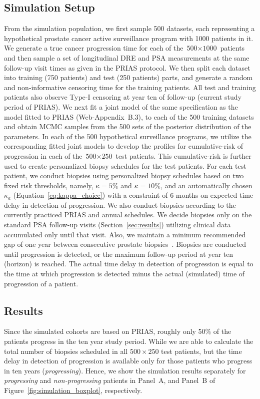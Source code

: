 \subsection{Simulation Setup}
From the simulation population, we first sample 500 datasets, each representing a hypothetical prostate cancer active surveillance program with 1000 patients in it. We generate a true cancer progression time for each of the ${\mbox{500} \times \mbox{1000}}$ patients and then sample a set of longitudinal DRE and PSA measurements at the same follow-up visit times as given in the PRIAS protocol. We then split each dataset into training (750 patients) and test (250 patients) parts, and generate a random and non‐informative censoring time for the training patients. All test and training patients also observe Type-I censoring at year ten of follow-up (current study period of PRIAS). We next fit a joint model of the same specification as the model fitted to PRIAS (Web-Appendix~B.3), to each of the 500 training datasets and obtain MCMC samples from the 500 sets of the posterior distribution of the parameters. In each of the 500 hypothetical surveillance programs, we utilize the corresponding fitted joint models to develop the profiles for cumulative-risk of progression in each of the ${\mbox{500} \times \mbox{250}}$ test patients. This cumulative-risk is further used to create personalized biopsy schedules for the test patients. For each test patient, we conduct biopsies using personalized biopsy schedules based on two fixed risk thresholds, namely, $\kappa=5\%$ and $\kappa=10\%$, and an automatically chosen $\kappa_a$ (Equation~\ref{eq:kappa_choice}) with a constraint of 6 months on expected time delay in detection of progression. We also conduct biopsies according to the currently practiced PRIAS and annual schedules. We decide biopsies only on the standard PSA follow-up visits (Section~\ref{sec:results}) utilizing clinical data accumulated only until that visit. Also, we maintain a minimum recommended gap of one year between consecutive prostate biopsies~\citep{bokhorst2015compliance}. Biopsies are conducted until progression is detected, or the maximum follow-up period at year ten (horizon) is reached. The actual time delay in detection of progression is equal to the time at which progression is detected minus the actual (simulated) time of progression of a patient.

\subsection{Results}
Since the simulated cohorts are based on PRIAS, roughly only 50\% of the patients progress in the ten year study period. While we are able to calculate the total number of biopsies scheduled in all $500 \times 250$ test patients, but the time delay in detection of progression is available only for those patients who progress in ten years (\textit{progressing}). Hence, we show the simulation results separately for \textit{progressing} and \textit{non-progressing} patients in Panel~A, and Panel~B of Figure~\ref{fig:simulation_boxplot}, respectively.

